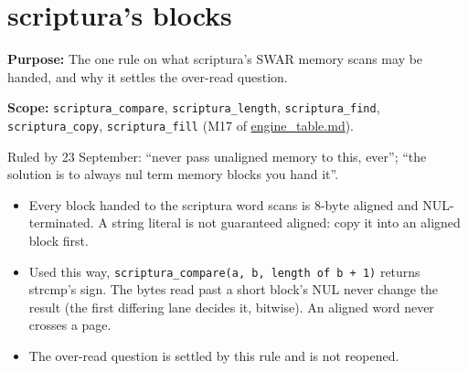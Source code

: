 \chapter{\texorpdfstring{scriptura's blocks}{scriptura's blocks}}
\label{chap:scriptura-blocks}

\textbf{Purpose:} The one rule on what scriptura's SWAR memory scans may be handed, and why it settles the over-read question.

\textbf{Scope:} \texttt{scriptura\_\allowbreak{}compare}, \texttt{scriptura\_\allowbreak{}length}, \texttt{scriptura\_\allowbreak{}find}, \texttt{scriptura\_\allowbreak{}copy}, \texttt{scriptura\_\allowbreak{}fill} (M17 of \hyperref[chap:engine-table]{engine\_\allowbreak{}table.md}).

Ruled by 23 September: “never pass unaligned memory to this, ever”; “the solution is to always nul term memory blocks you hand it”.

\begin{itemize}
\item Every block handed to the scriptura word scans is 8-byte aligned and NUL-terminated. A string literal is not guaranteed aligned: copy it into an aligned block first.
\item Used this way, \texttt{scriptura\_\allowbreak{}compare(a, b, length of b + 1)} returns strcmp's sign. The bytes read past a short block's NUL never change the result (the first differing lane decides it, bitwise). An aligned word never crosses a page.
\item The over-read question is settled by this rule and is not reopened.
\end{itemize}
